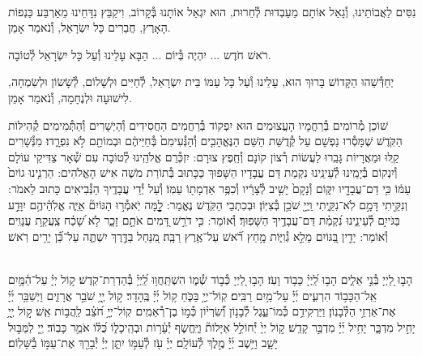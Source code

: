 \documentclass[twoside, openany, parskip=half, 11pt]{book}
\begin{document}
\\
נִסִּים לַאֲבוֹתֵינוּ, וְ֯גָאַל אוֹתָם מֵעַבְדוּת לְ֯חֵרוּת, הוּא יִגְאַל אוֹתָנוּ בְּ֯קָרוֹב, וִיקַבֵּץ נִדָּחֵינוּ מֵאַרְבַּע כַּנְפוֹת הָאָרֶץ, חֲבֵרִים כָּל יִשְׂרָאֵל, וְ֯נֹאמַר אָמֵן.

רֹאשׁ חֹדֶש ... יִהְיֶה בְּ֯יוֹם ... הַבָּא עָלֵינוּ וְ֯עַל כָּל יִשְׂרָאֵל לְ֯טוֹבָה.

יְחַדְּ֯שֵׁהוּ הַקָּדוֹשׁ בָּרוּךְ הוּא, עָלֵינוּ וְ֯עַל כָּל עַמּוֹ בֵּית יִשְׂרָאֵל, לְ֯חַיִּים וּלְשָׁלוֹם, לְ֯שָׂשׂוֹן וּלְשִׂמְחָה, לִישׁוּעָה וּלְנֶחָמָה, וְ֯נֹאמַר אָמֵן.

\sepline

שׁוֹכֵן מְ֯רוֹמִים בְּ֯רַחֲמָיו הָעֲצוּמִים הוּא יִפְקוֹד בְּ֯רַחֲמִים הַחֲסִידִים וְ֯הַיְשָׁרִים וְ֯הַתְּ֯מִימִים קְ֯הִילּוֹת הַקֹּֽדֶשׁ שֶׁמָּסְ֯רוּ נַפְשָׁם עַל קְ֯דֻשַּׁת הַשֵּׁם הַנֶּאֱהָבִ֤ים וְ֯הַנְּ֯עִימִם֙ בְּ֯חַיֵּיהֶ֔ם וּבְמוֹתָ֖ם לֹ֣א נִפְרָ֑דוּ׃ מִנְּ֯שָׁרִים קַֽלּוּ וּמֵאֲרָיוֹת גָּבֵֽרוּ לַעֲשׂוֹת רְ֯צוֹן קוֹנָם וְ֯חֵֽפֶץ צוּרָם: יִזְכְּ֯רֵם אֱלֹהֵֽינוּ לְ֯טוֹבָה עִם שְׁ֯אָר צַדִּיקֵי עוֹלָם וְ֯יִנְקוֹם בְּ֯יָמֵֽינוּ לְ֯עֵינֵֽינוּ נִקְמַת דַּם עֲבָדָיו הַשָּׁפוּךְ כַּכָּתוּב בְּ֯תוֹרַת מֹשֶׁה אִישׁ הָאֱלֹהִים: הַרְנִ֤ינוּ גוֹיִם֙ עַמּ֔וֹ כִּ֥י דַם־עֲבָדָ֖יו יִקּ֑וֹם וְ֯נָקָם֙ יָשִׁ֣יב לְ֯צָרָ֔יו וְ֯כִפֶּ֥ר אַדְמָת֖וֹ עַמּֽוֹ׃ וְ֯עַל יְ֯דֵי עֲבָדֶֽיךָ הַנְּ֯בִיאִים כָּתוּב לֵאמֹר: וְנִקֵּ֖יתִי דָּמָ֣ם לֹֽא־נִקֵּ֑יתִי וַֽיְיָ֖ שֹׁכֵ֥ן בְּ֯צִיּֽוֹן׃ וּבְכִתְבֵי הַקֹּֽדֶשׁ נֶאֱמַר: לׇׇׇׇׇׇ֤מָּה יֹֽאמְ֯ר֣וּ הַגּוֹיִם֘ אַיֵּ֢ה אֱלֹֽהֵ֫יהֶ֥ם יִוָּדַ֣ע בַּגֹּייִ֣ם לְ֯עֵינֵ֑ינוּ נִ֝קְמַ֗ת דַּם־עֲבָדֶ֥יךָ הַשָּׁפֽוּךְ׃ וְ֯אוֹמֵר: כִּ֤י דֹרֵ֣שׁ דָּ֭מִים אֹתָ֣ם זָכָ֑ר לֹ֥א שָׁ֝כַ֗ח צַֽעֲקַ֥ת עֲנָוִֽים׃ וְ֯אוֹמֵר: יָדִ֣ין בַּ֭גּוֹיִם מָלֵ֣א גְ֯וִיּ֑וֹת מָ֥חַץ רֹ֝֗אשׁ עַל־אֶ֥רֶץ רַבָּֽה׃ מִ֭נַּחַל בַּדֶּ֣רֶךְ יִשְׁתֶּ֑ה עַל־כֵּ֝֗ן יָרִ֥ים רֹֽאשׁ׃



\vspace{-0.5\baselineskip}
\ashrei


\yehalelu

\\
%
הָב֣וּ לַ֭יְיָ בְּ֯נֵ֣י אֵלִ֑ים הָב֥וּ לַֽ֝יְיָ֗ כָּב֥וֹד וָעֹֽז׃
הָב֣וּ לַ֭יְיָ כְּ֯ב֣וֹד שְׁ֯מ֑וֹ הִשְׁתַּֽחֲו֥וּ לַֽ֝יְיָ֗ בְּ֯הַדְרַת־קֹֽדֶשׁ׃
ק֥וֹל יְיָ֗ עַל־הַ֫מָּ֥יִם אֵֽל־הַכָּב֥וֹד הִרְעִ֑ים יְ֜יָ֗ עַל־מַ֥יִם רַבִּֽים׃
קֽוֹל־יְיָ֥ בַּכֹּ֑חַ ק֥וֹל יְ֜יָ֗ בֶּֽהָדָר׃
ק֣וֹל יְ֖יָ֥ שֹׁבֵ֣ר אֲרָזִ֑ים וַיְשַׁבֵּ֥ר יְ֜יָ֗ אֶת־אַרְזֵ֥י הַלְּ֯בָנֽוֹן׃
וַיַּרְקִידֵ֥ם כְּ֯מוֹ־עֵ֑גֶל לְ֯בָנ֥וֹן וְ֝֯שִׂרְי֗וֹן כְּ֯מ֣וֹ בֶן־רְ֯אֵמִֽים׃
קֽוֹל־יְיָ֥ חֹ֝צֵ֗ב לַֽהֲב֥וֹת אֵֽשׁ׃
ק֣וֹל יְ֖יָ֥ יָחִ֣יל מִדְבָּ֑ר יָחִ֥יל יְ֜יָ֗ מִדְבַּ֣ר קָדֵֽשׁ׃
ק֣וֹל יְיָ֙ יְ֯חוֹלֵ֣ל אַיָּלוֹת֘ וַיֶּֽחֱשׂ֢ף יְ֯עָ֫ר֥וֹת וּבְהֵֽיכָל֑וֹ כֻּ֝לּ֗וֹ אֹמֵ֥ר כָּבֽוֹד׃
יְ֖יָ לַמַּבּ֣וּל יָשָׁ֑ב וַיֵּ֥שֶׁב יְ֜יָ֗ מֶ֣לֶךְ לְ֯עוֹלָֽם׃
יְיָ֗ עֹ֖ז לְ֯עַמּ֣וֹ יִתֵּ֑ן יְיָ֓ יְ֯בָרֵ֖ךְ אֶת־עַמּ֣וֹ בַ֯שָּׁלֽוֹם׃
\end{document}
